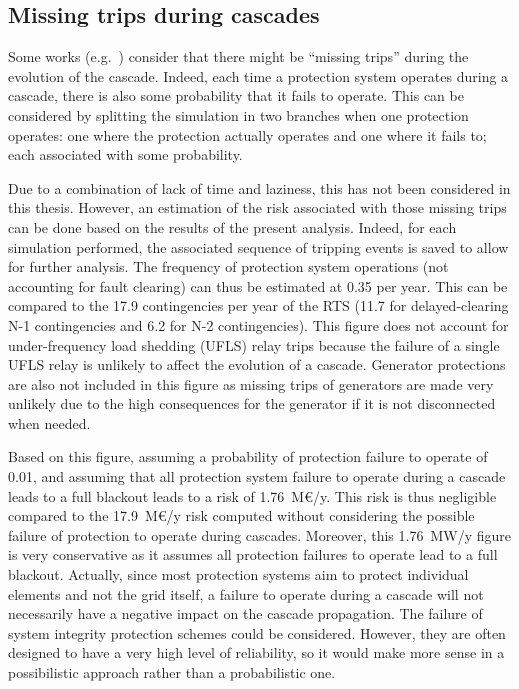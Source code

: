 \subsection{Missing trips during cascades}
\label{sec:PDSA_results_missing_trips}

Some works (e.g.~\cite{Faghihi, DCATphase1}) consider that there might be ``missing trips'' during the evolution of the cascade. Indeed, each time a protection system operates during a cascade, there is also some probability that it fails to operate. This can be considered by splitting the simulation in two branches when one protection operates: one where the protection actually operates and one where it fails to; each associated with some probability.

Due to a combination of lack of time and laziness, this has not been considered in this thesis. However, an estimation of the risk associated with those missing trips can be done based on the results of the present analysis. Indeed, for each simulation performed, the associated sequence of tripping events is saved to allow for further analysis. The frequency of protection system operations (not accounting for fault clearing) can thus be estimated at 0.35 per year. This can be compared to the 17.9 contingencies per year of the RTS (11.7 for delayed-clearing N-1 contingencies and 6.2 for N-2 contingencies). This figure does not account for under-frequency load shedding (UFLS) relay trips because the failure of a single UFLS relay is unlikely to affect the evolution of a cascade. Generator protections are also not included in this figure as missing trips of generators are made very unlikely due to the high consequences for the generator if it is not disconnected when needed.

Based on this figure, assuming a probability of protection failure to operate of 0.01, and assuming that all protection system failure to operate during a cascade leads to a full blackout leads to a risk of 1.76~M€/y. This risk is thus negligible compared to the 17.9~M€/y risk computed without considering the possible failure of protection to operate during cascades. Moreover, this 1.76~MW/y figure is very conservative as it assumes all protection failures to operate lead to a full blackout. Actually, since most protection systems aim to protect individual elements and not the grid itself, a failure to operate during a cascade will not necessarily have a negative impact on the cascade propagation. The failure of system integrity protection schemes could be considered. However, they are often designed to have a very high level of reliability, so it would make more sense in a possibilistic approach rather than a probabilistic one.

